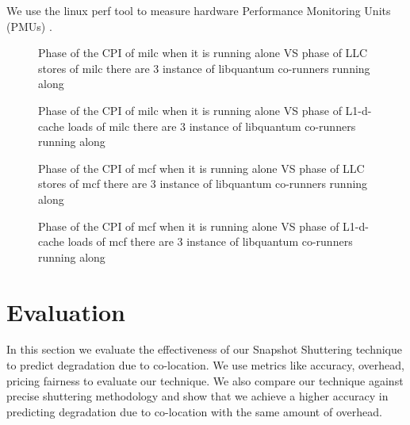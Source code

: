 \documentclass[pageno]{jpaper}
\begin{document}
We use the linux perf tool to measure hardware Performance Monitoring Units (PMUs) \cite{denew}.
\begin{figure*}
\centering
\begin{minipage}[t]{1\columnwidth}
\centering
{}
\caption{Phase of the CPI of milc when it is running alone VS phase of LLC stores of milc there are 3 instance of libquantum co-runners running along}
\label{fig:milclibllc}
\end{minipage}
\hfill\begin{minipage}[t]{1\columnwidth}
\centering
{}
\caption{Phase of the CPI of milc when it is running alone VS phase of L1-d-cache loads of milc there are 3 instance of libquantum co-runners running along\vspace{-25 mm}}
\label{fig:milclibl1d}
\end{minipage}
\end{figure*}
\begin{figure*}
\centering
\begin{minipage}[t]{1\columnwidth}
\centering
{}
\caption{Phase of the CPI of mcf when it is running alone VS phase of LLC stores of mcf there are 3 instance of libquantum co-runners running along}
\label{fig:mcflibllc}
\end{minipage}
\hfill\begin{minipage}[t]{1\columnwidth}
\centering
{}
\caption{Phase of the CPI of mcf when it is running alone VS phase of L1-d-cache loads of mcf there are 3 instance of libquantum co-runners running along}
\label{fig:mcflibl1d}
\end{minipage}
\end{figure*}
\section{Evaluation}
\label{sec:Evaluation}

In this section we evaluate the effectiveness of our Snapshot Shuttering technique to predict degradation due to co-location. We use metrics like accuracy, overhead, pricing fairness to evaluate our technique. We also compare our technique against precise shuttering methodology and show that we achieve a higher accuracy in predicting degradation due to co-location with the same amount of overhead.
\end{document}
